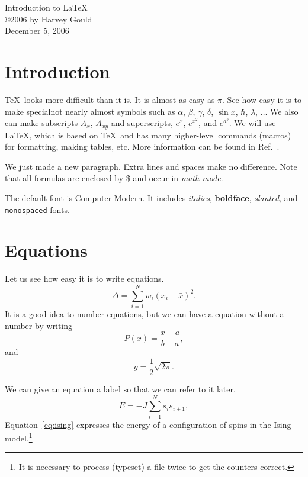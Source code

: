 \documentclass[12pt]{article}
\begin{document}
\begin{center}
	{\large Introduction to \LaTeX} \\ %
	\copyright 2006 by Harvey Gould \\
	December 5, 2006
\end{center}

\section{Introduction}
\TeX\ looks more difficult than it is. It is
almost as easy as $\pi$. See how easy it is to make specialnot nearly almost  
symbols such as $\alpha$,
$\beta$, $\gamma$,
$\delta$, $\sin x$, $\hbar$, $\lambda$, $\ldots$ We also can make
subscripts
$A_{x}$, $A_{xy}$ and superscripts, $e^x$, $e^{x^2}$, and
$e^{a^b}$. We will use \LaTeX, which is based on \TeX\ and has
many higher-level commands (macros) for formatting, making
tables, etc. More information can be found in Ref.~\cite{latex}.

We just made a new paragraph. Extra lines and spaces make no
difference. Note that all formulas are enclosed by
\$ and occur in \textit{math mode}.

The default font is Computer Modern. It includes \textit{italics},
\textbf{boldface},
\textsl{slanted}, and \texttt{monospaced} fonts.

\section{Equations}
Let us see how easy it is to write equations.
\begin{equation}
	\Delta =\sum_{i=1}^N w_i (x_i - \bar{x})^2 .
\end{equation}
It is a good idea to number equations, but we can have a
equation without a number by writing
\begin{equation}
	P(x) = \frac{x - a}{b - a} , \nonumber
\end{equation}
and
\begin{equation}
	g = \frac{1}{2} \sqrt{2\pi} . \nonumber
\end{equation}

We can give an equation a label so that we can refer to it later.
\begin{equation}
	\label{eq:ising}
	E = -J \sum_{i=1}^N s_i s_{i+1} ,
\end{equation}
Equation~\eqref{eq:ising} expresses the energy of a configuration
of spins in the Ising model.\footnote{It is necessary to process (typeset) a
file twice to get the counters correct.}
\end{document}
